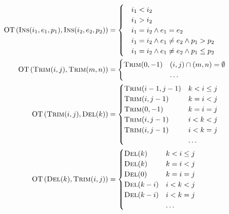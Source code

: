 \begin{align}
  \text{OT}\left(\textsc{Ins}(i_1, e_1, p_1), \textsc{Ins}(i_2, e_2, p_2)\right) &= \begin{cases}
    & i_1 < i_2 \\
    & i_1 > i_2 \\
    & i_1 = i_2 \land e_1 = e_2 \\
    & i_1 = i_2 \land e_1 \neq e_2 \land p_1 > p_2 \\
    & i_1 = i_2 \land e_1 \neq e_2 \land p_1 \le p_2
  \end{cases}\\
  \text{OT}\left(\textsc{Trim}(i,j), \textsc{Trim}(m,n)\right) &= \begin{cases}
    \textsc{Trim}(0,-1)	& (i,j) \cap (m,n) = \emptyset	\\
    & \ldots
  \end{cases}\\
  \text{OT}\left(\textsc{Trim}(i,j), \textsc{Del}(k)\right) &= \begin{cases}
    \textsc{Trim}(i-1, j-1) 	& k < i \le j	\\
    \textsc{Trim}(i, j-1) 	& k = i < j	\\
    \textsc{Trim}(0, -1)	& k = i = j	\\
    \textsc{Trim}(i, j-1)	& i < k < j	\\
    \textsc{Trim}(i, j-1)	& i < k = j	\\
    & \ldots
  \end{cases}\\
  \text{OT}\left(\textsc{Del}(k), \textsc{Trim}(i,j)\right) &= \begin{cases}
    \textsc{Del}(k)	& k < i \le j 	\\
    \textsc{Del}(k)	& k = i < j	\\
    \textsc{Del}(0)	& k = i = j	\\
    \textsc{Del}(k-i)	& i < k < j	\\
    \textsc{Del}(k-i)	& i < k = j	\\
    & \ldots
  \end{cases}\\
\end{align}
